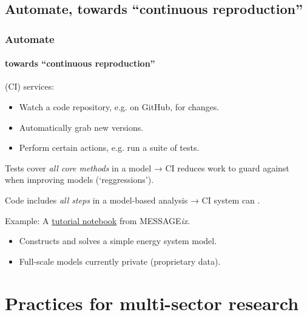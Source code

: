 \documentclass[12pt,aspectratio=169]{beamer}
\begin{document}
\subsection{Automate, towards “continuous reproduction”}
\begin{frame}
\frametitle{Automate}
\framesubtitle{towards “continuous reproduction”}

 (CI) services:
\begin{itemize}
  \item Watch a code repository, e.g. on GitHub, for changes.
  \item Automatically grab new versions.
  \item Perform certain actions, e.g. run a suite of tests.
\end{itemize}

\medskip
Tests cover \emph{all core methods} in a model → CI reduces work to guard against  when improving models (‘reggressions’).

\medskip
Code includes \emph{all steps} in a model-based analysis → CI system can .

Example: A \href{https://github.com/iiasa/message_ix/blob/main/tutorial/westeros/westeros_baseline.ipynb}{tutorial notebook} from MESSAGE\emph{ix}.
\begin{itemize}
  \item Constructs and solves a simple energy system model.
  \item Full-scale models currently private (proprietary data).
\end{itemize}

\end{frame}


\section{Practices for multi-sector research}

\begin{frame}[plain]
\tableofcontents[currentsection]
\end{frame}
\end{document}
